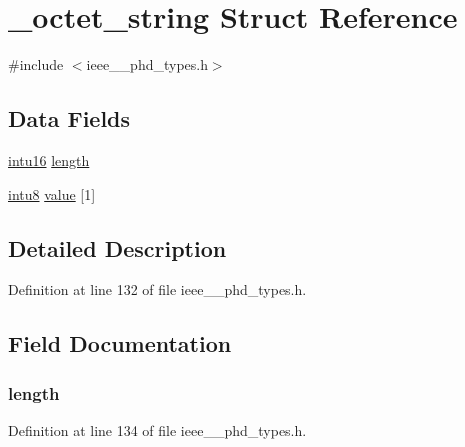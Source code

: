 \hypertarget{struct__octet__string}{}\section{\+\_\+octet\+\_\+string Struct Reference}
\label{struct__octet__string}


{\ttfamily \#include $<$ieee\+\_\+\_\+phd\+\_\+types.\+h$>$}

\subsection*{Data Fields}
\begin{DoxyCompactItemize}
\item 
\hyperlink{ieee__11073__phd__types_8h_a3561595d2aa7416532e1c9910abd076d}{intu16} \hyperlink{struct__octet__string_a3743679e4ff85e3e1b3fc2e59973fbb3}{length}
\item 
\hyperlink{ieee__11073__phd__types_8h_ae21d5428a584a153613cbe335630d3f4}{intu8} \hyperlink{struct__octet__string_a60ac419fb75046efa2e20ee72ec2ea45}{value} \mbox{[}1\mbox{]}
\end{DoxyCompactItemize}


\subsection{Detailed Description}


Definition at line 132 of file ieee\+\_\+\_\+phd\+\_\+types.\+h.



\subsection{Field Documentation}
\hypertarget{struct__octet__string_a3743679e4ff85e3e1b3fc2e59973fbb3}{}
\subsubsection[{length}]{ length}\label{struct__octet__string_a3743679e4ff85e3e1b3fc2e59973fbb3}


Definition at line 134 of file ieee\+\_\+\_\+phd\+\_\+types.\+h.

\hypertarget{struct__octet__string_a60ac419fb75046efa2e20ee72ec2ea45}{}
